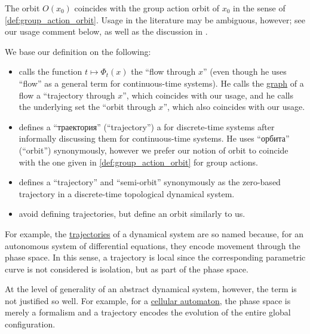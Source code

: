 \begin{comments}
  \item The orbit \( O(x_0) \) coincides with the group action orbit of \( x_0 \) in the sense of \cref{def:group_action_orbit}. Usage in the literature may be ambiguous, however; see our usage comment below, as well as the discussion in \cite{MathSE:orbit_and_trajectory_in_dynamical_system}.

  \item We base our definition on the following:
  \begin{itemize}
    \item \Textcite[361]{Rozikov2012MultiDimensionalTimeDynamicalSystem} calls the function \( t \mapsto \Phi_t(x) \) the \enquote{flow through \( x \)} (even though he uses \enquote{flow} as a general term for continuous-time systems). He calls the \hyperref[def:set_valued_function/graph]{graph} of a flow a \enquote{trajectory through \( x \)}, which coincides with our usage, and he calls the underlying set the \enquote{orbit through \( x \)}, which also coincides with our usage.

    \item \Textcite[35]{Юмагулов2015ДинамическиеСистемы} defines a \enquote{траектория} (\enquote{trajectory}) a for discrete-time systems after informally discussing them for continuous-time systems. He uses \enquote{орбита} (\enquote{orbit}) synonymously, however we prefer our notion of orbit to coincide with the one given in \cref{def:group_action_orbit} for group actions.

    \item \Textcite[def. 3.4.4]{HadelerMüller2017CellularAutomata} defines a \enquote{trajectory} and \enquote{semi-orbit} synonymously as the zero-based trajectory in a discrete-time topological dynamical system.

    \item \Textcite[2]{BrinStuck2002DynamicalSystems} avoid defining trajectories, but define an orbit similarly to us.
  \end{itemize}
\end{comments}

\begin{remark}\label{rem:dynamical_system_trajectory_terminology}
  For example, the \hyperref[def:dynamical_system_trajectory]{trajectories} of a dynamical system are so named because, for an autonomous system of differential equations, they encode movement through the phase space. In this sense, a trajectory is local since the corresponding parametric curve is not considered is isolation, but as part of the phase space.

  At the level of generality of an abstract dynamical system, however, the term is not justified so well. For example, for a \hyperref[def:cellular_automaton]{cellular automaton}, the phase space is merely a formalism and a trajectory encodes the evolution of the entire global configuration.
\end{remark}

